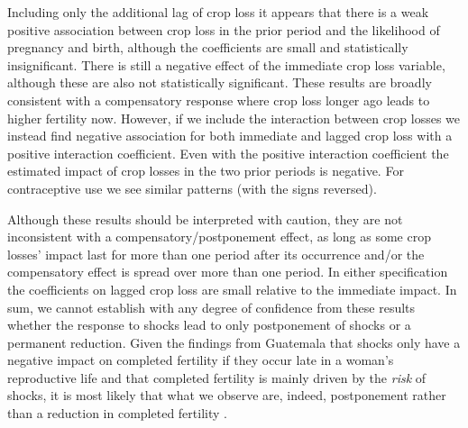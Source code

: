 \documentclass[letterpaper,12pt]{article}
\begin{document}
Including only the additional lag of crop loss it appears that 
there is a weak positive association between crop loss in the prior
period and the likelihood of pregnancy and birth, although the 
coefficients are small and statistically insignificant.
There is still a negative effect of the immediate crop loss
variable, although these are also not statistically significant.
These results are broadly consistent with a compensatory response
where crop loss longer ago leads to higher fertility now.
However, if we include the interaction between crop losses we 
instead find negative association for both immediate and lagged 
crop loss with a positive interaction coefficient.
Even with the positive interaction coefficient the estimated 
impact of crop losses in the two prior periods is negative.
For contraceptive use we see similar patterns (with the signs 
reversed).

Although these results should be interpreted with caution, they
are not inconsistent with a compensatory/postponement effect, 
as long as some crop losses' impact last for more than one
period after its occurrence and/or the compensatory effect is
spread over more than one period.
In either specification the coefficients on lagged crop loss
are small relative to the immediate impact.
In sum, we cannot establish with any degree of confidence from
these results whether the response to shocks lead to only postponement 
of shocks or a permanent reduction.
Given the findings from Guatemala that shocks only 
have a negative impact on completed fertility if they occur
late in a woman's reproductive life and that completed 
fertility is mainly driven by the \emph{risk} of shocks,
it is most likely that what we observe are, indeed, postponement
rather than a reduction in completed fertility \citep{Portner2014}.

\end{document}
